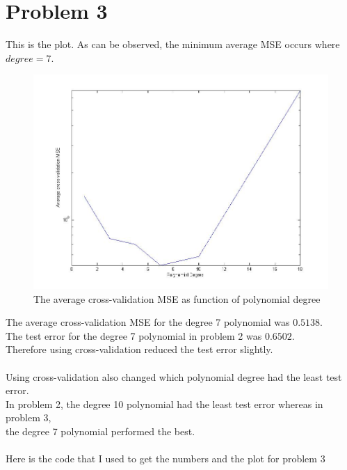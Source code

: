 \documentclass[twoside,11pt]{article}
\theoremstyle{definition}
\begin{document}
\newpage

\section*{Problem 3}

This is the plot. As can be observed, the minimum average MSE occurs where $degree=7$. \\
\begin{figure}[h]
\centering
\includegraphics[width=5 in]{prob2Plot.jpg}
\caption{The average cross-validation MSE as function of polynomial degree}
\end{figure}
The average cross-validation MSE for the degree 7 polynomial was $0.5138$.\\
The test error for the degree 7 polynomial in problem 2 was $0.6502$.\\
Therefore using cross-validation reduced the test error slightly.\\
\\
Using cross-validation also changed which polynomial degree had the least test error. \\
In problem 2, the degree 10 polynomial had the least test error whereas in problem 3, \\
the degree 7 polynomial performed the best. \\
\\
\newpage
Here is the code that I used to get the numbers and the plot for problem 3

\end{document}
